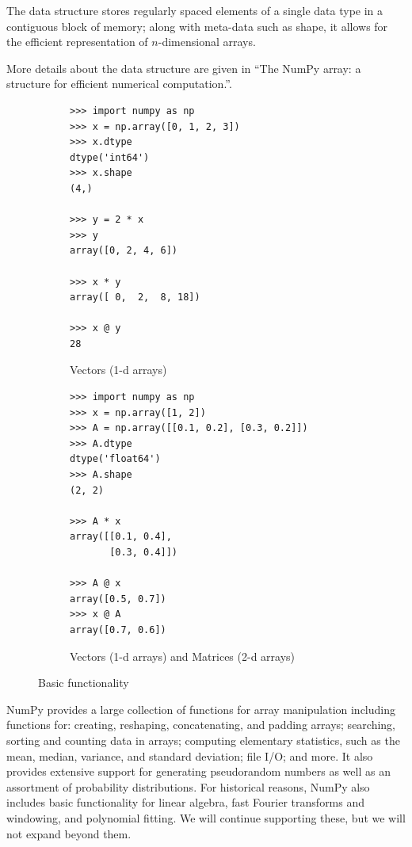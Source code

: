 The  data structure stores regularly spaced elements of a single
data type in a contiguous block of memory; along with meta-data such as shape,
it allows for the efficient representation of $n$-dimensional arrays.


More details about the data structure are given in ``The NumPy array:
a structure for efficient numerical computation.''\cite{vanderwalt2011numpy}.


\begin{figure}
\centering
\begin{subfigure}{.5\textwidth}
\begin{lstlisting}
>>> import numpy as np
>>> x = np.array([0, 1, 2, 3])
>>> x.dtype
dtype('int64')
>>> x.shape
(4,)

>>> y = 2 * x
>>> y
array([0, 2, 4, 6])

>>> x * y
array([ 0,  2,  8, 18])

>>> x @ y
28
\end{lstlisting}
  \caption{Vectors (1-d arrays)}
  \label{fig:sub1}
\end{subfigure}%
\begin{subfigure}{.5\textwidth}
\begin{lstlisting}
>>> import numpy as np
>>> x = np.array([1, 2])
>>> A = np.array([[0.1, 0.2], [0.3, 0.2]])
>>> A.dtype 
dtype('float64')
>>> A.shape
(2, 2)

>>> A * x
array([[0.1, 0.4],
       [0.3, 0.4]])

>>> A @ x
array([0.5, 0.7])
>>> x @ A
array([0.7, 0.6])
\end{lstlisting}
  \caption{Vectors (1-d arrays) and Matrices (2-d arrays)}
  \label{fig:sub2}
\end{subfigure}
\caption{Basic functionality}
\label{fig:basic-functionality}
\end{figure}


NumPy provides a large collection of functions for array manipulation
including functions for: creating, reshaping, concatenating, and padding arrays;
searching, sorting and counting data
in arrays; computing elementary statistics, such as the mean, median,
variance, and standard deviation; file I/O; and more.
It also provides extensive support for generating pseudorandom numbers
as well as an assortment of probability distributions.
For historical reasons, NumPy also includes basic functionality for
linear algebra, fast Fourier transforms and windowing,
and polynomial fitting.
We will continue supporting these, but we will not expand beyond them.


